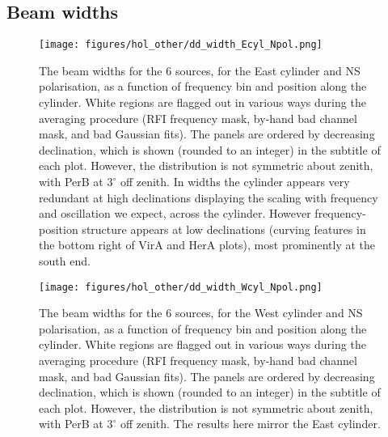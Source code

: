 \newpage

\subsection{Beam widths}
\begin{figure}[h!]
\begin{center}
\texttt{[image: figures/hol\_other/dd\_width\_Ecyl\_Npol.png]}
\caption{The beam widths for the 6 sources, for the East cylinder and NS polarisation, as a function of frequency bin and position along the cylinder. White regions are flagged out in various ways during the averaging procedure (RFI frequency mask, by-hand bad channel mask, and bad Gaussian fits). The panels are ordered by decreasing declination, which is shown (rounded to an integer) in the subtitle of each plot. However, the distribution is not symmetric about zenith, with PerB at $3^{\circ}$ off zenith. In widths the cylinder appears very redundant at high declinations displaying the scaling with frequency and oscillation we expect, across the cylinder. However frequency-position structure appears at low declinations (curving features in the bottom right of VirA and HerA plots), most prominently at the south end.}
\end{center}
\end{figure}

\begin{figure}[h!]
\begin{center}
\texttt{[image: figures/hol\_other/dd\_width\_Wcyl\_Npol.png]}
\caption{The beam widths for the 6 sources, for the West cylinder and NS polarisation, as a function of frequency bin and position along the cylinder. White regions are flagged out in various ways during the averaging procedure (RFI frequency mask, by-hand bad channel mask, and bad Gaussian fits). The panels are ordered by decreasing declination, which is shown (rounded to an integer) in the subtitle of each plot. However, the distribution is not symmetric about zenith, with PerB at $3^{\circ}$ off zenith. \newline The results here mirror the East cylinder.}
\end{center}
\end{figure}

